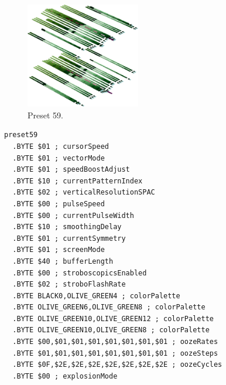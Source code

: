 \vspace*{0.5cm}
\begin{minipage}[b]{0.48\linewidth}
\begin{figure}[H]                                                          
  \centering                                                             
  \begin{adjustbox}{width=5cm,center}                                   
  \includegraphics[width=5cm]{src/colorspace_presets/preset59-45.png}%
  \end{adjustbox}                                                        
\caption*{Preset 59.}                                           
\end{figure}                                                               
\end{minipage}
\hspace{0.1cm}
\begin{minipage}[b]{0.48\linewidth}                                                                         
\begin{lstlisting}[basicstyle=\ttfamily\tiny]
preset59
  .BYTE $01 ; cursorSpeed
  .BYTE $01 ; vectorMode
  .BYTE $01 ; speedBoostAdjust
  .BYTE $10 ; currentPatternIndex
  .BYTE $02 ; verticalResolutionSPAC
  .BYTE $00 ; pulseSpeed
  .BYTE $00 ; currentPulseWidth
  .BYTE $10 ; smoothingDelay
  .BYTE $01 ; currentSymmetry
  .BYTE $01 ; screenMode
  .BYTE $40 ; bufferLength
  .BYTE $00 ; stroboscopicsEnabled
  .BYTE $02 ; stroboFlashRate
  .BYTE BLACK0,OLIVE_GREEN4 ; colorPalette
  .BYTE OLIVE_GREEN6,OLIVE_GREEN8 ; colorPalette
  .BYTE OLIVE_GREEN10,OLIVE_GREEN12 ; colorPalette
  .BYTE OLIVE_GREEN10,OLIVE_GREEN8 ; colorPalette
  .BYTE $00,$01,$01,$01,$01,$01,$01,$01 ; oozeRates
  .BYTE $01,$01,$01,$01,$01,$01,$01,$01 ; oozeSteps
  .BYTE $0F,$2E,$2E,$2E,$2E,$2E,$2E,$2E ; oozeCycles
  .BYTE $00 ; explosionMode
\end{lstlisting}
\end{minipage}


